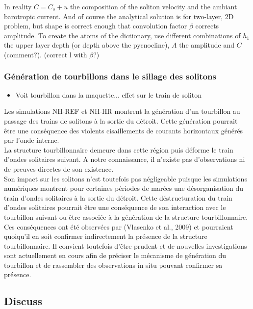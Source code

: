 In reality $C=C_s+u$ the composition of the soliton velocity and the ambiant barotropic current. And of course the analytical solution is for two-layer, 2D problem, but shape is correct enough that convolution factor $\beta$ corrects amplitude. To create the atoms of the dictionary, use different combinations of $h_1$ the upper layer depth (or depth above the pycnocline), $A$ the amplitude and $C$  (comment?). (correct l with $\beta$?)






\subsubsection{Génération de tourbillons dans le sillage des solitons}

\begin{itemize}
\item Voit tourbillon dans la maquette... effet sur le train de soliton
\end{itemize}


Les simulations NH-REF et NH-HR montrent la génération d'un tourbillon au passage des trains de solitons à la sortie du détroit. Cette génération pourrait être une conséquence des violents cisaillements de courants horizontaux générés par l'onde interne.\\
La structure tourbillonnaire demeure dans cette région puis déforme le train d'ondes solitaires suivant. A notre connaissance, il n'existe pas d'observations ni de preuves directes de son existence.\\
Son impact sur les solitons n'est toutefois pas négligeable puisque les simulations numériques montrent pour certaines périodes de marées une désorganisation du train d'ondes solitaires à la sortie du détroit. Cette déstructuration du train d'ondes solitaires pourrait être une conséquence de son interaction avec le tourbillon suivant ou être associée à la génération de la structure tourbillonnaire. Ces conséquences ont été observées par (Vlasenko et al., 2009) et pourraient quoiqu'il en soit confirmer indirectement la présence de la structure tourbillonnaire. Il convient toutefois d'être prudent et de nouvelles investigations sont actuellement en cours afin de préciser le mécanisme de génération du tourbillon et de rassembler des observations in situ pouvant confirmer sa présence.




\subsection{Discuss}

